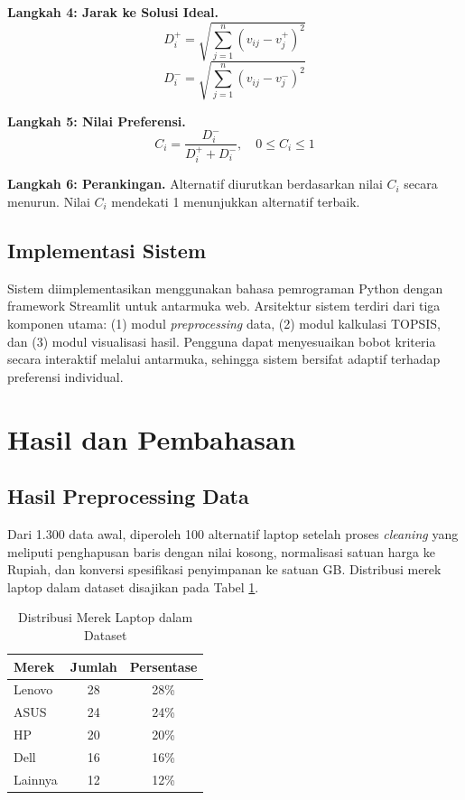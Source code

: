 \documentclass[10pt, a4paper, twocolumn]{article}
\begin{document}
\textbf{Langkah 4: Jarak ke Solusi Ideal.}
\begin{equation}
D_i^+ = \sqrt{\sum_{j=1}^{n} (v_{ij} - v_j^+)^2}
\end{equation}
\begin{equation}
D_i^- = \sqrt{\sum_{j=1}^{n} (v_{ij} - v_j^-)^2}
\end{equation}

\textbf{Langkah 5: Nilai Preferensi.}
\begin{equation}
C_i = \frac{D_i^-}{D_i^+ + D_i^-}, \quad 0 \leq C_i \leq 1
\end{equation}

\textbf{Langkah 6: Perankingan.}
Alternatif diurutkan berdasarkan nilai $C_i$ secara menurun. Nilai $C_i$ mendekati 1 menunjukkan alternatif terbaik.

\subsection{Implementasi Sistem}

Sistem diimplementasikan menggunakan bahasa pemrograman Python dengan framework Streamlit untuk antarmuka web. Arsitektur sistem terdiri dari tiga komponen utama: (1) modul \textit{preprocessing} data, (2) modul kalkulasi TOPSIS, dan (3) modul visualisasi hasil. Pengguna dapat menyesuaikan bobot kriteria secara interaktif melalui antarmuka, sehingga sistem bersifat adaptif terhadap preferensi individual.

\section{Hasil dan Pembahasan}

\subsection{Hasil Preprocessing Data}

Dari 1.300 data awal, diperoleh 100 alternatif laptop setelah proses \textit{cleaning} yang meliputi penghapusan baris dengan nilai kosong, normalisasi satuan harga ke Rupiah, dan konversi spesifikasi penyimpanan ke satuan GB. Distribusi merek laptop dalam dataset disajikan pada Tabel \ref{tab:distribusi}.

\begin{table}[H]
\centering
\caption{Distribusi Merek Laptop dalam Dataset}
\label{tab:distribusi}
\begin{tabular}{lcc}
\toprule
\textbf{Merek} & \textbf{Jumlah} & \textbf{Persentase} \\
\midrule
Lenovo & 28 & 28\% \\
ASUS & 24 & 24\% \\
HP & 20 & 20\% \\
Dell & 16 & 16\% \\
Lainnya & 12 & 12\% \\
\bottomrule
\end{tabular}
\end{table}
\end{document}
